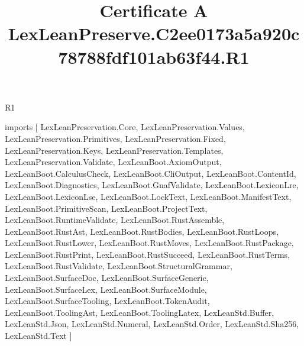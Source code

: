\begin{lexlean}{R1}
\title{Certificate A LexLeanPreserve.C2ee0173a5a920c78788fdf101ab63f44.R1}
\begin{coremodule}
imports [
  LexLeanPreservation.Core,
  LexLeanPreservation.Values,
  LexLeanPreservation.Primitives,
  LexLeanPreservation.Fixed,
  LexLeanPreservation.Keys,
  LexLeanPreservation.Templates,
  LexLeanPreservation.Validate,
  LexLeanBoot.AxiomOutput,
  LexLeanBoot.CalculusCheck,
  LexLeanBoot.CliOutput,
  LexLeanBoot.ContentId,
  LexLeanBoot.Diagnostics,
  LexLeanBoot.GnafValidate,
  LexLeanBoot.LexiconLre,
  LexLeanBoot.LexiconLse,
  LexLeanBoot.LockText,
  LexLeanBoot.ManifestText,
  LexLeanBoot.PrimitiveScan,
  LexLeanBoot.ProjectText,
  LexLeanBoot.RuntimeValidate,
  LexLeanBoot.RustAssemble,
  LexLeanBoot.RustAst,
  LexLeanBoot.RustBodies,
  LexLeanBoot.RustLoops,
  LexLeanBoot.RustLower,
  LexLeanBoot.RustMoves,
  LexLeanBoot.RustPackage,
  LexLeanBoot.RustPrint,
  LexLeanBoot.RustSucceed,
  LexLeanBoot.RustTerms,
  LexLeanBoot.RustValidate,
  LexLeanBoot.StructuralGrammar,
  LexLeanBoot.SurfaceDoc,
  LexLeanBoot.SurfaceGeneric,
  LexLeanBoot.SurfaceLex,
  LexLeanBoot.SurfaceModule,
  LexLeanBoot.SurfaceTooling,
  LexLeanBoot.TokenAudit,
  LexLeanBoot.ToolingAst,
  LexLeanBoot.ToolingLatex,
  LexLeanStd.Buffer,
  LexLeanStd.Json,
  LexLeanStd.Numeral,
  LexLeanStd.Order,
  LexLeanStd.Sha256,
  LexLeanStd.Text
]


\end{coremodule}
\end{lexlean}
